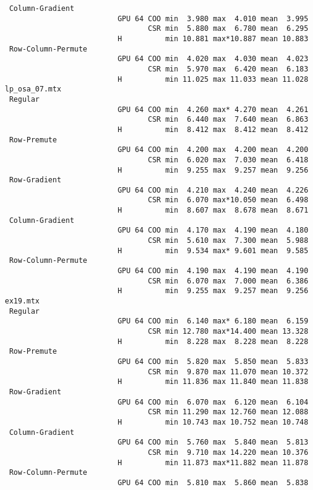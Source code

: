 {\begin{verbatim}
 Column-Gradient
                          GPU 64 COO min  3.980 max  4.010 mean  3.995
                                 CSR min  5.880 max  6.780 mean  6.295
                          H          min 10.881 max*10.887 mean 10.883
 Row-Column-Permute
                          GPU 64 COO min  4.020 max  4.030 mean  4.023
                                 CSR min  5.970 max  6.420 mean  6.183
                          H          min 11.025 max 11.033 mean 11.028
lp_osa_07.mtx
 Regular
                          GPU 64 COO min  4.260 max* 4.270 mean  4.261
                                 CSR min  6.440 max  7.640 mean  6.863
                          H          min  8.412 max  8.412 mean  8.412
 Row-Premute
                          GPU 64 COO min  4.200 max  4.200 mean  4.200
                                 CSR min  6.020 max  7.030 mean  6.418
                          H          min  9.255 max  9.257 mean  9.256
 Row-Gradient
                          GPU 64 COO min  4.210 max  4.240 mean  4.226
                                 CSR min  6.070 max*10.050 mean  6.498
                          H          min  8.607 max  8.678 mean  8.671
 Column-Gradient
                          GPU 64 COO min  4.170 max  4.190 mean  4.180
                                 CSR min  5.610 max  7.300 mean  5.988
                          H          min  9.534 max* 9.601 mean  9.585
 Row-Column-Permute
                          GPU 64 COO min  4.190 max  4.190 mean  4.190
                                 CSR min  6.070 max  7.000 mean  6.386
                          H          min  9.255 max  9.257 mean  9.256
ex19.mtx
 Regular
                          GPU 64 COO min  6.140 max* 6.180 mean  6.159
                                 CSR min 12.780 max*14.400 mean 13.328
                          H          min  8.228 max  8.228 mean  8.228
 Row-Premute
                          GPU 64 COO min  5.820 max  5.850 mean  5.833
                                 CSR min  9.870 max 11.070 mean 10.372
                          H          min 11.836 max 11.840 mean 11.838
 Row-Gradient
                          GPU 64 COO min  6.070 max  6.120 mean  6.104
                                 CSR min 11.290 max 12.760 mean 12.088
                          H          min 10.743 max 10.752 mean 10.748
 Column-Gradient
                          GPU 64 COO min  5.760 max  5.840 mean  5.813
                                 CSR min  9.710 max 14.220 mean 10.376
                          H          min 11.873 max*11.882 mean 11.878
 Row-Column-Permute
                          GPU 64 COO min  5.810 max  5.860 mean  5.838

\end{verbatim}}
